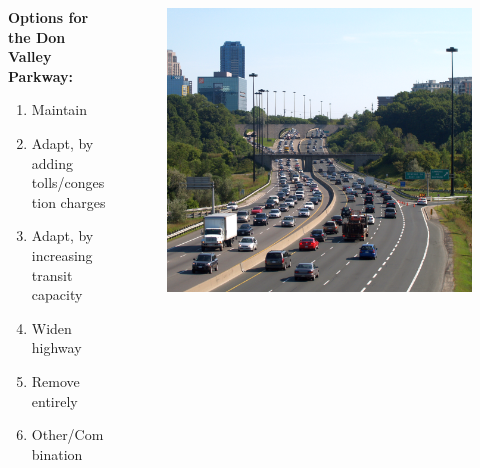 \documentclass[aspectratio=169]{beamer}
\begin{document}
\begin{frame}
	\begin{columns}
		\begin{column}{0.5\textwidth}
			
			\textbf{Options for the Don Valley Parkway:}
			
			\begin{enumerate}
				\item Maintain
				\item Adapt, by adding tolls/congestion charges
				\item Adapt, by increasing transit capacity
				\item Widen highway
				\item Remove entirely
				\item Other/Combination
			\end{enumerate}
			
		\end{column}
		
		\begin{column}{0.5\textwidth}
			\begin{figure}
				\centering
				\includegraphics[width=1\linewidth]{images/dvp_congestion_2014.png}
			\end{figure}
			
		\end{column}
		
		
		
	\end{columns}
\end{frame}
\end{document}
